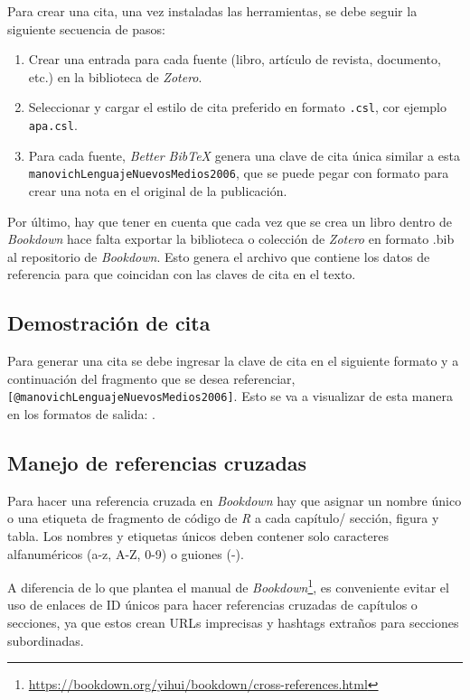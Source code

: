 \documentclass[
]{krantz}
\DeclareRobustCommand{\href}[2]{#2\footnote{\url{#1}}}
\begin{document}
Para crear una cita, una vez instaladas las herramientas, se debe seguir la siguiente secuencia de pasos:

\begin{enumerate}
\def\labelenumi{\arabic{enumi}.}
\item
  Crear una entrada para cada fuente (libro, artículo de revista, documento, etc.) en la biblioteca de \emph{Zotero}.
\item
  Seleccionar y cargar el estilo de cita preferido en formato \texttt{.csl}, cor ejemplo \texttt{apa.csl}.
\item
  Para cada fuente, \emph{Better BibTeX} genera una clave de cita única similar a esta \texttt{manovichLenguajeNuevosMedios2006}, que se puede pegar con formato para crear una nota en el original de la publicación.
\end{enumerate}

Por último, hay que tener en cuenta que cada vez que se crea un libro dentro de \emph{Bookdown} hace falta exportar la biblioteca o colección de \emph{Zotero} en formato .bib al repositorio de \emph{Bookdown}. Esto genera el archivo que contiene los datos de referencia para que coincidan con las claves de cita en el texto.

\hypertarget{demostraciuxf3n-de-cita}{%
\subsection{Demostración de cita}\label{demostraciuxf3n-de-cita}}

Para generar una cita se debe ingresar la clave de cita en el siguiente formato y a continuación del fragmento que se desea referenciar, \texttt{{[}@manovichLenguajeNuevosMedios2006{]}}. Esto se va a visualizar de esta manera en los formatos de salida: \citep{manovichLenguajeNuevosMedios2006}.

\hypertarget{manejo-de-referencias-cruzadas}{%
\subsection{Manejo de referencias cruzadas}\label{manejo-de-referencias-cruzadas}}

Para hacer una referencia cruzada en \emph{Bookdown} hay que asignar un nombre único o una etiqueta de fragmento de código de \emph{R} a cada capítulo/ sección, figura y tabla. Los nombres y etiquetas únicos deben contener solo caracteres alfanuméricos (a-z, A-Z, 0-9) o guiones (-).

A diferencia de lo que plantea el \href{https://bookdown.org/yihui/bookdown/cross-references.html}{manual de \emph{Bookdown}}, es conveniente evitar el uso de enlaces de ID únicos para hacer referencias cruzadas de capítulos o secciones, ya que estos crean URLs imprecisas y hashtags extraños para secciones subordinadas.
\end{document}
